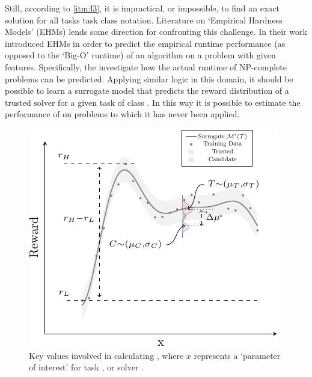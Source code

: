         Still, according to \ref{itm:l3}, it is impractical, or impossible, to find an exact solution for all tasks $\text{task class notation}$. Literature on `Empirical Hardness Models' (EHMs) lends some direction for confronting this challenge. In their work \cite{Leyton-Brown2009-yr,Hutter2009-og} introduced EHMs in order to predict the empirical runtime performance (as opposed to the `Big-O' runtime) of an algorithm on a problem with given features. Specifically, the investigate how the actual runtime of NP-complete problems can be predicted. Applying similar logic in this domain, it should be possible to learn a surrogate model \surrogate{} that predicts the reward distribution \rwdstarapprox{} of a trusted solver \solvestar{} for a given task \task{} of class \taskclass. In this way it is possible to estimate the performance of \solvestar{} on problems to which it has never been applied.
        
   \begin{figure}[tb]
        \centering
        \includegraphics[width=0.75\linewidth]{Figures/sq_v2_fig-crop}
        \caption{Key values involved in calculating \xQ, where $x$ represents a `parameter of interest' for task \task, or solver \solve.}
        \label{fig:sq_v2}
    \end{figure}

